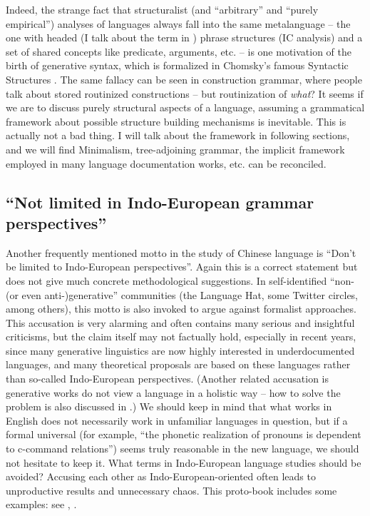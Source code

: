 \documentclass[../main.tex]{subfiles}
\begin{document}
Indeed, the strange fact that structuralist (and ``arbitrary'' and ``purely empirical'') analyses of 
languages always fall into the same metalanguage -- the one with headed (I talk about the term in 
) phrase structures (IC analysis) and a set of shared concepts like predicate, 
arguments, etc. -- is one motivation of the birth of generative syntax, which is formalized in Chomsky's 
famous Syntactic Structures \citep{chomsky2009syntactic}. The same fallacy can be seen in construction grammar,
where people talk about stored routinized constructions -- but routinization of \emph{what}? 
It seems if we are to discuss purely structural aspects of a language, assuming a grammatical framework 
about possible structure building mechanisms is inevitable. This is actually not a bad thing. I will 
talk about the framework in following sections, and we will find Minimalism, tree-adjoining
grammar, the implicit framework employed in many language documentation works, etc. can be reconciled.

\subsection{``Not limited in Indo-European grammar perspectives''}

Another frequently mentioned motto in the study of Chinese language is ``Don't be limited to Indo-European
perspectives''. Again this is a correct statement but does not give much concrete methodological suggestions.
In self-identified ``non-(or even anti-)generative'' communities (the Language Hat, some Twitter circles, 
among others), this motto is also invoked to argue against formalist approaches. This accusation is very alarming and often contains many serious and insightful criticisms, but the claim itself may not factually 
hold, especially in recent years, since many generative linguistics are now highly interested in
underdocumented languages, and many theoretical proposals \citep{preminger2014agreement} are based on %
these languages rather than so-called Indo-European perspectives. (Another related accusation is 
generative works do not view a language in a holistic way -- how to solve the problem is also 
discussed in .) We should keep in mind 
that what works in English does not necessarily work in unfamiliar languages in question, but if 
a formal universal (for example, ``the phonetic realization of pronouns is dependent to c-command relations'')
seems truly reasonable in the new language, we should not hesitate to keep it.
What terms in Indo-European language studies should be avoided? Accusing each other as Indo-European-oriented 
often leads to unproductive results and unnecessary chaos. This proto-book includes some examples: 
see , . %
\end{document}
